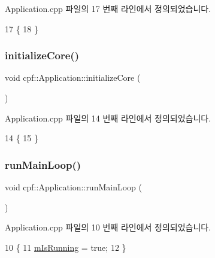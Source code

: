 Application.\+cpp 파일의 17 번째 라인에서 정의되었습니다.


\begin{DoxyCode}
17                                   \{
18     \}
\end{DoxyCode}
\mbox{\label{classcpf_1_1_application_a676898244f732414360ced11ed65379c}} 
\subsubsection{\texorpdfstring{initialize\+Core()}{initializeCore()}}
{\footnotesize\ttfamily void cpf\+::\+Application\+::initialize\+Core (\begin{DoxyParamCaption}{ }\end{DoxyParamCaption})\hspace{0.3cm}{\ttfamily [private]}}



Application.\+cpp 파일의 14 번째 라인에서 정의되었습니다.


\begin{DoxyCode}
14                                      \{
15     \}
\end{DoxyCode}
\mbox{\label{classcpf_1_1_application_a52e76d84434e072ad6dafdf7a0f4fd59}} 
\subsubsection{\texorpdfstring{run\+Main\+Loop()}{runMainLoop()}}
{\footnotesize\ttfamily void cpf\+::\+Application\+::run\+Main\+Loop (\begin{DoxyParamCaption}{ }\end{DoxyParamCaption})}



Application.\+cpp 파일의 10 번째 라인에서 정의되었습니다.


\begin{DoxyCode}
10                                   \{
11         \hyperlink{classcpf_1_1_application_a84a6e2bafcc39719acee9885a064ac75}{mIsRunning} = \textcolor{keyword}{true};
12     \}
\end{DoxyCode}


